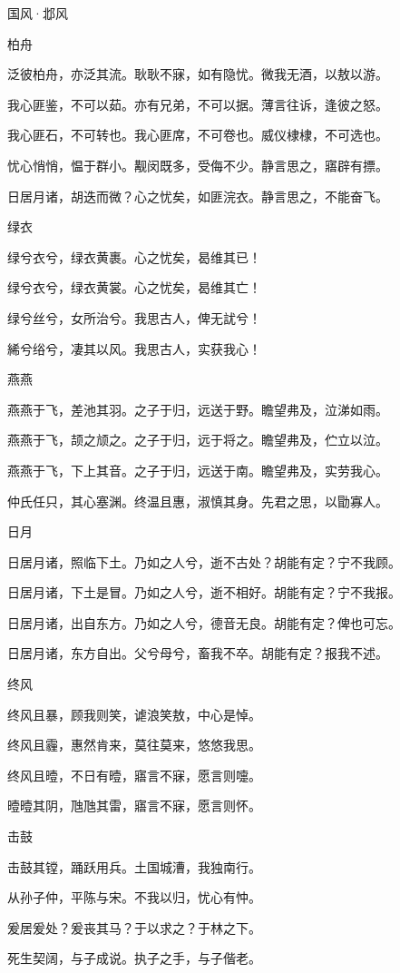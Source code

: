 国风·邶风


柏舟

泛彼柏舟，亦泛其流。耿耿不寐，如有隐忧。微我无酒，以敖以游。

我心匪鉴，不可以茹。亦有兄弟，不可以据。薄言往诉，逢彼之怒。

我心匪石，不可转也。我心匪席，不可卷也。威仪棣棣，不可选也。

忧心悄悄，愠于群小。觏闵既多，受侮不少。静言思之，寤辟有摽。

日居月诸，胡迭而微？心之忧矣，如匪浣衣。静言思之，不能奋飞。

绿衣

绿兮衣兮，绿衣黄裹。心之忧矣，曷维其已！

绿兮衣兮，绿衣黄裳。心之忧矣，曷维其亡！

绿兮丝兮，女所治兮。我思古人，俾无訧兮！

絺兮绤兮，凄其以风。我思古人，实获我心！

燕燕

燕燕于飞，差池其羽。之子于归，远送于野。瞻望弗及，泣涕如雨。

燕燕于飞，颉之颃之。之子于归，远于将之。瞻望弗及，伫立以泣。

燕燕于飞，下上其音。之子于归，远送于南。瞻望弗及，实劳我心。

仲氏任只，其心塞渊。终温且惠，淑慎其身。先君之思，以勖寡人。

日月

日居月诸，照临下土。乃如之人兮，逝不古处？胡能有定？宁不我顾。

日居月诸，下土是冒。乃如之人兮，逝不相好。胡能有定？宁不我报。

日居月诸，出自东方。乃如之人兮，德音无良。胡能有定？俾也可忘。

日居月诸，东方自出。父兮母兮，畜我不卒。胡能有定？报我不述。

终风

终风且暴，顾我则笑，谑浪笑敖，中心是悼。

终风且霾，惠然肯来，莫往莫来，悠悠我思。

终风且曀，不日有曀，寤言不寐，愿言则嚏。

曀曀其阴，虺虺其雷，寤言不寐，愿言则怀。

击鼓

击鼓其镗，踊跃用兵。土国城漕，我独南行。

从孙子仲，平陈与宋。不我以归，忧心有忡。

爰居爰处？爰丧其马？于以求之？于林之下。

死生契阔，与子成说。执子之手，与子偕老。

